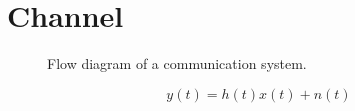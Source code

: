 \section{Channel}


\begin{figure}[htb]
	\centering
	
	\caption{Flow diagram of a communication system.}
\end{figure}
\begin{equation}
	y(t)
	=
	h(t)x(t)
	+
	n(t)
\end{equation}
